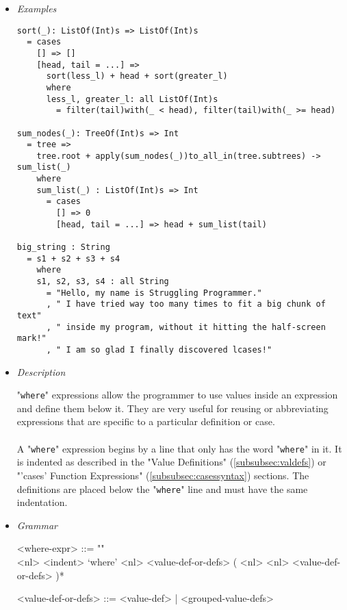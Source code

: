 \documentclass[diploma]{softlab-thesis}
\begin{document}
\begin{itemize}

\item \textit{Examples}
\begin{verbatim}
sort(_): ListOf(Int)s => ListOf(Int)s
  = cases
    [] => []
    [head, tail = ...] =>
      sort(less_l) + head + sort(greater_l)
      where
      less_l, greater_l: all ListOf(Int)s
        = filter(tail)with(_ < head), filter(tail)with(_ >= head)

sum_nodes(_): TreeOf(Int)s => Int
  = tree =>
    tree.root + apply(sum_nodes(_))to_all_in(tree.subtrees) -> sum_list(_)
    where
    sum_list(_) : ListOf(Int)s => Int
      = cases
        [] => 0
        [head, tail = ...] => head + sum_list(tail)

big_string : String
  = s1 + s2 + s3 + s4
    where
    s1, s2, s3, s4 : all String
      = "Hello, my name is Struggling Programmer."
      , " I have tried way too many times to fit a big chunk of text"
      , " inside my program, without it hitting the half-screen mark!"
      , " I am so glad I finally discovered lcases!"
\end{verbatim}

\item \textit{Description}

"\verb|where|" expressions allow the programmer to use values inside an
expression and define them below it. They are very useful for reusing or
abbreviating expressions that are specific to a particular definition or case.
\\\\
A "\verb|where|" expression begins by a line that only has the word
"\verb|where|" in it. It is indented as described in the "Value Definitions"
(\ref{subsubsec:valdefs}) or "'cases' Function Expressions"
(\ref{subsubsec:casessyntax}) sections.  The definitions are placed below the
"\verb|where|" line and must have the same indentation.

\item \textit{Grammar}
\begin{grammar}
<where-expr> ::= ""\\
<nl> <indent> `where'
<nl> <value-def-or-defs> ( <nl> <nl> <value-def-or-defs> )*

<value-def-or-defs> ::= <value-def> | <grouped-value-defs>
\end{grammar}

\end{itemize}

\newpage
\end{document}
